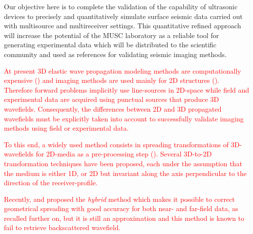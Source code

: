 \documentclass[extra,mreferee]{gji}
\begin{document}
Our objective here is to complete the validation of the capability of ultrasonic devices to precisely and quantitatively simulate surface seismic data carried out with multisource and multireceiver settings. This quantitative refined approach will increase the potential of the MUSC laboratory as a reliable tool for generating experimental data which will be distributed to the scientific community and used as references for validating seismic imaging methods. %

\textcolor{red}{At present 3D elastic wave propagation modeling methods are computationally expensive (\cite{etienne2010computational,borisov2013efficient,brossier2013performances,butzer20133d,borisov2015three}) and imaging methods are used mainly for 2D structures (\cite{brossier2009two,romdhane2011shallow,bretaudeau2013fwi,groos2014role}). Therefore forward problems implicitly use line-sources in 2D-space while field and experimental data are acquired using punctual sources that produce 3D wavefields. Consequently, the differences between 2D and 3D propagated wavefields must be explicitly taken into account to successfully validate imaging methods using field or experimental data.}

\textcolor{red}{To this end, a widely used method consists in spreading transformations of 3D-wavefields for 2D-media as a pre-processing step (\cite{crase1990robust,shipp2002two,ravaut2004multiscale,wang2009reflection,bretaudeau2013fwi}). Several 3D-to-2D transformation techniques have been proposed, each under the assumption that the medium is either 1D, or 2D but invariant along the axis perpendicular to the direction of the receiver-profile.}

\textcolor{red}{Recently, \cite{Forbriger_LSS_2014} and \cite{schafer2014lss} proposed the \textit{hybrid} method which makes it possible to correct geometrical spreading with good accuracy for both near- and far-field data, as recalled further on, but it is still an approximation and this method is known to fail to retrieve backscattered wavefield.}

\end{document}
